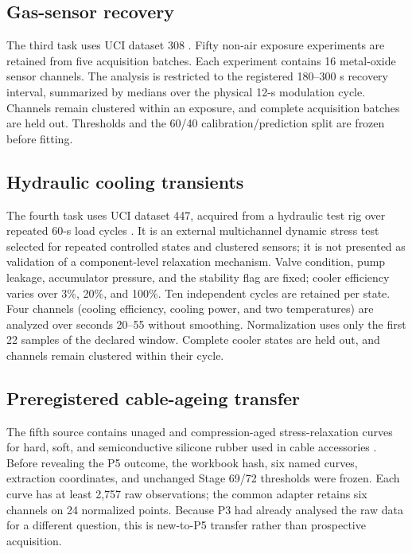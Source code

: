 \documentclass[11pt]{article}
\begin{document}
\subsection{Gas-sensor recovery}
The third task uses UCI dataset 308 \cite{ziyatdinov2015dataset}. Fifty non-air exposure experiments are retained from five acquisition batches. Each experiment contains 16 metal-oxide sensor channels. The analysis is restricted to the registered 180--300 s recovery interval, summarized by medians over the physical 12-s modulation cycle. Channels remain clustered within an exposure, and complete acquisition batches are held out. Thresholds and the 60/40 calibration/prediction split are frozen before fitting.

\subsection{Hydraulic cooling transients}
The fourth task uses UCI dataset 447, acquired from a hydraulic test rig over repeated 60-s load cycles \cite{helwig2018hydraulic}. It is an external multichannel dynamic stress test selected for repeated controlled states and clustered sensors; it is not presented as validation of a component-level relaxation mechanism. Valve condition, pump leakage, accumulator pressure, and the stability flag are fixed; cooler efficiency varies over 3\%, 20\%, and 100\%. Ten independent cycles are retained per state. Four channels (cooling efficiency, cooling power, and two temperatures) are analyzed over seconds 20--55 without smoothing. Normalization uses only the first 22 samples of the declared window. Complete cooler states are held out, and channels remain clustered within their cycle.

\subsection{Preregistered cable-ageing transfer}
The fifth source contains unaged and compression-aged stress-relaxation curves for hard, soft, and semiconductive silicone rubber used in cable accessories \cite{kayanja2026cableageing}. Before revealing the P5 outcome, the workbook hash, six named curves, extraction coordinates, and unchanged Stage 69/72 thresholds were frozen. Each curve has at least 2,757 raw observations; the common adapter retains six channels on 24 normalized points. Because P3 had already analysed the raw data for a different question, this is new-to-P5 transfer rather than prospective acquisition.
\end{document}
